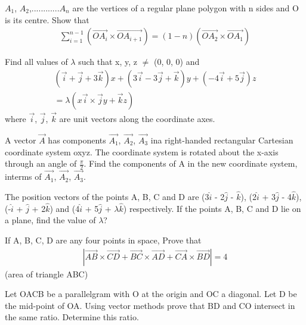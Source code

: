 \item $A_1$, $A_2$,............$A_n$ are the vertices of a regular plane polygon with n sides and O is its centre. Show that 
\begin{align*}
\sum_{i=1}^{n-1} (\overrightarrow{OA_{i}} \times \overrightarrow{OA_{i+1}}) = (1-n)(\overrightarrow{OA_{2}} \times \overrightarrow{OA_{1}})
\end{align*}

\item Find all values of $\lambda$ such that x, y, z $\neq$ (0, 0, 0) and 
\begin{align*}
(\overrightarrow{i} + \overrightarrow{j} + 3\overrightarrow{k})x + (3\overrightarrow{i} - 3\overrightarrow{j} + \overrightarrow{k})y + (-4\overrightarrow{i} + 5\overrightarrow{j})z\\
 = \lambda(x\overrightarrow{i} \times \overrightarrow{j}y + \overrightarrow{k}z)
\end{align*}
where $\overrightarrow{i}$, $\overrightarrow{j}$, $\overrightarrow{k}$ are unit vectors along the coordinate axes.

\item A vector $\overrightarrow{A}$ has components $\overrightarrow{A_1}$, $\overrightarrow{A_2}$, $\overrightarrow{A_3}$ ina right-handed rectangular Cartesian coordinate system oxyz. The coordinate system is rotated about the x-axis through an angle of $\frac{\pi}{2}$. Find the components of A in the new coordinate system, interms of $\overrightarrow{A_1}$, 
$\overrightarrow{A_2}$, $\overrightarrow{A_3}$.

\item The position vectors of the points A, B, C and D are (3$\hat{i}$ - 2$\hat{j}$ - $\hat{k}$), (2$\hat{i}$ + 3$\hat{j}$ - 4$\hat{k}$), (-$\hat{i}$ + $\hat{j}$ + 2$\hat{k}$) and (4$\hat{i}$ + 5$\hat{j}$ + $\lambda\hat{k}$) respectively. If the points A, B, C and D lie on a plane, find the value of $\lambda$?

\item If A, B, C, D are any four points in space, Prove that
\begin{align*}
|\overrightarrow{AB} \times \overrightarrow{CD} + \overrightarrow{BC} \times \overrightarrow{AD} + \overrightarrow{CA} \times \overrightarrow{BD}|=4
\end{align*}  
(area of triangle ABC)

\item Let OACB be a parallelgram with O at the origin and OC a diagonal. Let D be the mid-point of OA. Using vector methods prove that BD and CO intersect in the same ratio. Determine this ratio.

